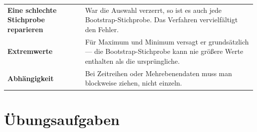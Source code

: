 \begin{warnung}
\begin{center}
\renewcommand{\arraystretch}{1.5}
\begin{tabular}{@{}P{2.6cm}P{6.0cm}@{}}
\toprule
\textbf{Eine schlechte Stichprobe reparieren} & War die Auswahl verzerrt, so ist es auch jede Bootstrap-Stichprobe. Das Verfahren vervielfältigt den Fehler.\\
\textbf{Extremwerte} & Für Maximum und Minimum versagt er grundsätzlich --- die Bootstrap-Stichprobe kann nie größere Werte enthalten als die ursprüngliche.\\
\textbf{Abhängigkeit} & Bei Zeitreihen oder Mehrebenendaten muss man blockweise ziehen, nicht einzeln.\\
\bottomrule
\end{tabular}
\end{center}

\begin{center}
\begin{minipage}{0.88\textwidth}
\end{minipage}
\end{center}
\end{warnung}

\section{Übungsaufgaben}

